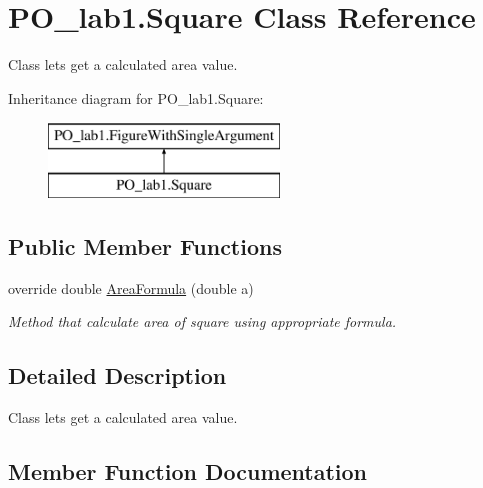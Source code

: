 \hypertarget{class_p_o__lab1_1_1_square}{}\section{P\+O\+\_\+lab1.\+Square Class Reference}
\label{class_p_o__lab1_1_1_square}


Class lets get a calculated area value.  


Inheritance diagram for P\+O\+\_\+lab1.\+Square\+:\begin{figure}[H]
\begin{center}
\leavevmode
\includegraphics[height=2.000000cm]{class_p_o__lab1_1_1_square}
\end{center}
\end{figure}
\subsection*{Public Member Functions}
\begin{DoxyCompactItemize}
\item 
override double \mbox{\hyperlink{class_p_o__lab1_1_1_square_aac1ad97365aabd8b19ae4058b834dd8d}{Area\+Formula}} (double a)
\begin{DoxyCompactList}\small\item\em Method that calculate area of square using appropriate formula. \end{DoxyCompactList}\end{DoxyCompactItemize}


\subsection{Detailed Description}
Class lets get a calculated area value. 



\subsection{Member Function Documentation}
\mbox{\label{class_p_o__lab1_1_1_square_aac1ad97365aabd8b19ae4058b834dd8d}} 

